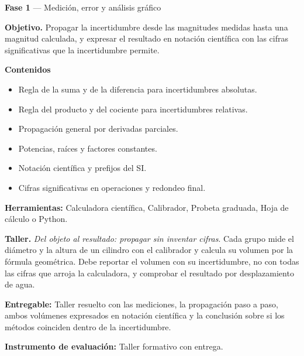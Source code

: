 \documentclass[11pt,a4paper]{article}
\begin{document}
\begin{tcolorbox}[cajaContenido,title={Semana 2 --- Propagación de incertidumbres y notación científica}]
\textbf{Fase 1} --- Medición, error y análisis gráfico

\textbf{Objetivo.} Propagar la incertidumbre desde las magnitudes medidas hasta una magnitud calculada, y expresar el resultado en notación científica con las cifras significativas que la incertidumbre permite.

\textbf{Contenidos}

\begin{itemize}[leftmargin=1.4em,itemsep=2pt,topsep=3pt]
  \item Regla de la suma y de la diferencia para incertidumbres absolutas.
  \item Regla del producto y del cociente para incertidumbres relativas.
  \item Propagación general por derivadas parciales.
  \item Potencias, raíces y factores constantes.
  \item Notación científica y prefijos del SI.
  \item Cifras significativas en operaciones y redondeo final.
\end{itemize}

\textbf{Herramientas:} Calculadora científica, Calibrador, Probeta graduada, Hoja de cálculo o Python.

\textbf{Taller.} \emph{Del objeto al resultado: propagar sin inventar cifras}. Cada grupo mide el diámetro y la altura de un cilindro con el calibrador y calcula su volumen por la fórmula geométrica. Debe reportar el volumen con su incertidumbre, no con todas las cifras que arroja la calculadora, y comprobar el resultado por desplazamiento de agua.

\textbf{Entregable:} Taller resuelto con las mediciones, la propagación paso a paso, ambos volúmenes expresados en notación científica y la conclusión sobre si los métodos coinciden dentro de la incertidumbre.

\textbf{Instrumento de evaluación:} Taller formativo con entrega.
\end{tcolorbox}
\end{document}
